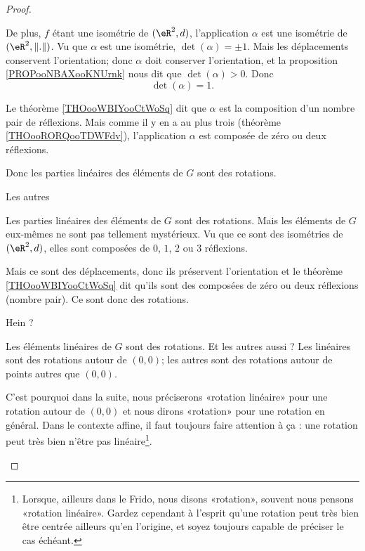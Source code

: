 \begin{proof}
\begin{subproof}
            De plus, \( f\) étant une isométrie de \( (\eR^2,d)\), l'application \( \alpha\) est une isométrie de \( (\eR^2,\| . \|)\). Vu que \( \alpha\) est une isométrie, \( \det(\alpha)=\pm1\). Mais les déplacements conservent l'orientation; donc \( \alpha\) doit conserver l'orientation, et la proposition \ref{PROPooNBAXooKNUrnk} nous dit que \( \det(\alpha)>0\). Donc
            \begin{equation}
                \det(\alpha)=1.
            \end{equation}

            Le théorème \ref{THOooWBIYooCtWoSq} dit que \( \alpha\) est la composition d'un nombre pair de réflexions. Mais comme il y en a au plus trois (théorème \ref{THOooRORQooTDWFdv}), l'application \( \alpha\) est composée de zéro ou deux réflexions.

            Donc les parties linéaires des éléments de \( G\) sont des rotations.
           
        \item[Les autres]

            Les parties linéaires des éléments de \( G\) sont des rotations. Mais les éléments de \( G\) eux-mêmes ne sont pas tellement mystérieux. Vu que ce sont des isométries de \( (\eR^2,d)\), elles sont composées de \( 0\), \( 1\), \( 2\) ou \( 3\) réflexions.

            Mais ce sont des déplacements, donc ils préservent l'orientation et le théorème \ref{THOooWBIYooCtWoSq} dit qu'ils sont des composées de zéro ou deux réflexions (nombre pair). Ce sont donc des rotations.

        \item[Hein ?]

            Les éléments linéaires de \( G\) sont des rotations. Et les autres aussi ? Les linéaires sont des rotations autour de \( (0,0)\); les autres sont des rotations autour de points autres que \( (0,0)\).

            C'est pourquoi dans la suite, nous préciserons «rotation linéaire» pour une rotation autour de \( (0,0)\) et nous dirons «rotation» pour une rotation en général. Dans le contexte affine, il faut toujours faire attention à ça : une rotation peut très bien n'être pas linéaire\footnote{Lorsque, ailleurs dans le Frido, nous disons «rotation», souvent nous pensons «rotation linéaire». Gardez cependant à l'esprit qu'une rotation peut très bien être centrée ailleurs qu'en l'origine, et soyez toujours capable de préciser le cas échéant.}.


\end{subproof}
\end{proof}
